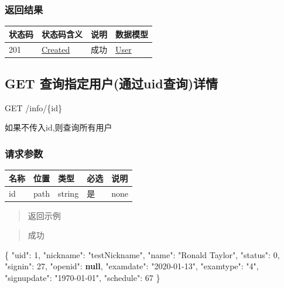 \documentclass[
]{article}
\newenvironment{Shaded}{}{}
\newcommand{\DataTypeTok}[1]{\textcolor[rgb]{0.56,0.13,0.00}{#1}}
\newcommand{\DecValTok}[1]{\textcolor[rgb]{0.25,0.63,0.44}{#1}}
\newcommand{\FunctionTok}[1]{\textcolor[rgb]{0.02,0.16,0.49}{#1}}
\newcommand{\KeywordTok}[1]{\textcolor[rgb]{0.00,0.44,0.13}{\textbf{#1}}}
\newcommand{\StringTok}[1]{\textcolor[rgb]{0.25,0.44,0.63}{#1}}
\begin{document}
\hypertarget{ux8fd4ux56deux7ed3ux679c-25}{%
\subsubsection{返回结果}\label{ux8fd4ux56deux7ed3ux679c-25}}

\begin{longtable}[]{@{}llll@{}}
\toprule
状态码 & 状态码含义 & 说明 & 数据模型 \\
\midrule
\endhead
201 & \href{https://tools.ietf.org/html/rfc7231\#section-6.3.2}{Created}
& 成功 & \protect\hyperlink{schemauser}{User} \\
\bottomrule
\end{longtable}

\hypertarget{get-ux67e5ux8be2ux6307ux5b9aux7528ux6237ux901aux8fc7uidux67e5ux8be2ux8be6ux60c5}{%
\subsection{GET
查询指定用户(通过uid查询)详情}\label{get-ux67e5ux8be2ux6307ux5b9aux7528ux6237ux901aux8fc7uidux67e5ux8be2ux8be6ux60c5}}

GET /info/\{id\}

如果不传入id,则查询所有用户

\hypertarget{ux8bf7ux6c42ux53c2ux6570-25}{%
\subsubsection{请求参数}\label{ux8bf7ux6c42ux53c2ux6570-25}}

\begin{longtable}[]{@{}lllll@{}}
\toprule
名称 & 位置 & 类型 & 必选 & 说明 \\
\midrule
\endhead
id & path & string & 是 & none \\
\bottomrule
\end{longtable}

\begin{quote}
返回示例
\end{quote}

\begin{quote}
成功
\end{quote}

\begin{Shaded}
\begin{Highlighting}[]
\FunctionTok{\{}
  \DataTypeTok{"uid"}\FunctionTok{:} \DecValTok{1}\FunctionTok{,}
  \DataTypeTok{"nickname"}\FunctionTok{:} \StringTok{"testNickname"}\FunctionTok{,}
  \DataTypeTok{"name"}\FunctionTok{:} \StringTok{"Ronald Taylor"}\FunctionTok{,}
  \DataTypeTok{"status"}\FunctionTok{:} \DecValTok{0}\FunctionTok{,}
  \DataTypeTok{"signin"}\FunctionTok{:} \DecValTok{27}\FunctionTok{,}
  \DataTypeTok{"openid"}\FunctionTok{:} \KeywordTok{null}\FunctionTok{,}
  \DataTypeTok{"examdate"}\FunctionTok{:} \StringTok{"2020{-}01{-}13"}\FunctionTok{,}
  \DataTypeTok{"examtype"}\FunctionTok{:} \StringTok{"4"}\FunctionTok{,}
  \DataTypeTok{"signupdate"}\FunctionTok{:} \StringTok{"1970{-}01{-}01"}\FunctionTok{,}
  \DataTypeTok{"schedule"}\FunctionTok{:} \DecValTok{67}
\FunctionTok{\}}
\end{Highlighting}
\end{Shaded}
\end{document}
